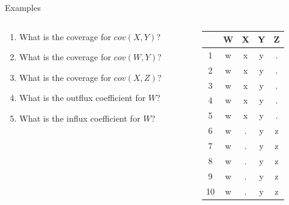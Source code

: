 \documentclass{beamer}\usepackage[]{graphicx}\usepackage[]{color}
\begin{document}
\begin{frame}{Examples}
  
  \begin{columns}
    \begin{column}{0.61\textwidth}
      
      \begin{enumerate}
      \item What is the coverage for $cov(X, Y)$?
        \vb
      \item What is the coverage for $cov(W, Y)$?
        \vb
      \item What is the coverage for $cov(X, Z)$?
        \vb
      \item What is the outflux coefficient for $W$?
        \vb
      \item What is the influx coefficient for $W$?
      \end{enumerate}
      
    \end{column}
    \begin{column}{0.39\textwidth}
      
\begin{table}[ht]
\centering
\begin{tabular}{ccccc}
  \toprule
 & W & X & Y & Z \\ 
  \midrule
1 & w & x & y & . \\ 
  2 & w & x & y & . \\ 
  3 & w & x & y & . \\ 
  4 & w & x & y & . \\ 
  5 & w & x & y & . \\ 
  6 & w & . & y & z \\ 
  7 & w & . & y & z \\ 
  8 & w & . & y & z \\ 
  9 & w & . & y & z \\ 
  10 & w & . & y & z \\ 
   \bottomrule
\end{tabular}
\end{table}


\end{column}
\end{columns}
 
\end{frame}

\end{document}
